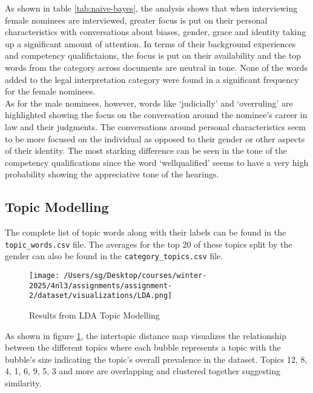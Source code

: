 \documentclass[titlepage]{article}
\begin{document}
As shown in table \ref{tab:naive-bayes}, the analysis shows that when interviewing female nominees are interviewed, greater focus 
is put on their personal characteristics with conversations about biases, gender, grace and identity taking up a significant amount 
of attention. In terms of their background experiences and competency qualifictaions, the focus is put on their availability and 
the top words from the category across documents are neutral in tone. None of the words added to the legal interpretation category 
were found in a significant frequency for the female nominees. \\

As for the male nominees, however, words like `judicially' and `overruling' are highlighted showing the focus on the conversation around 
the nominee's career in law and their judgments. The conversations around personal characteristics seem to be more focused on the 
individual as opposed to their gender or other aspects of their identity. The most starking difference can be seen in the tone of 
the competency qualifications since the word `wellqualified' seems to have a very high probability showing the appreciative tone 
of the hearings.

\subsection{Topic Modelling}

The complete list of topic words along with their labels can be found in the \texttt{topic\_words.csv} file. The averages for the top 
20 of these topics split by the gender can also be found in the \texttt{category\_topics.csv} file. 

\begin{figure}[H]\label{fig:LDA}
    \centering
    \texttt{[image: /Users/sg/Desktop/courses/winter-2025/4nl3/assignments/assignment-2/dataset/visualizations/LDA.png]}
    \caption{Results from LDA Topic Modelling}
\end{figure}

As shown in figure \ref{fig:LDA}, the intertopic distance map visualizes the relationship between the different topics where each bubble represents 
a topic with the bubble's size indicating the topic's overall prevalence in the dataset. Topics 12, 8, 4, 1, 6, 9, 5, 3 and more are overlapping and 
clustered together suggesting similarity. \\
\end{document}
